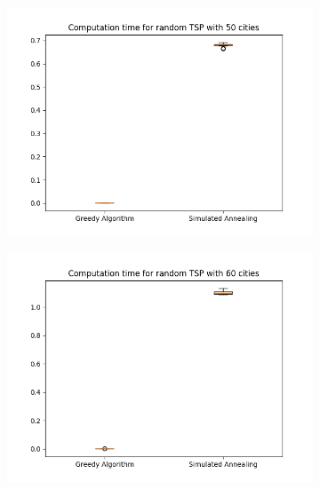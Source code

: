 \documentclass[14pt]
{article}
\begin{document}
\begin{figure}[H]
\centering
\begin{subfigure}{0.49\textwidth}
\centering
\includegraphics[width = \textwidth]{img/T50.png}
\end{subfigure}
\begin{subfigure}{0.49\textwidth}
\centering
\includegraphics[width = \textwidth]{img/T60.png}
\end{subfigure}
\begin{subfigure}{0.49\textwidth}
\centering

\end{subfigure}
\end{figure}
\end{document}
